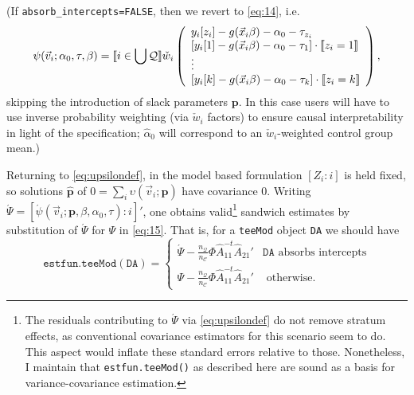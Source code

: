 \documentclass{article}
\DeclarePairedDelimiter{\indicator}{\llbracket}{\rrbracket}
\newcommand{\owt}[1][{[z_{i}]}]{\ensuremath{\check{w}_{i#1}}}
\newcommand{\absorbInterceptsEF}{\upsilon}
\begin{document}
(If \texttt{absorb\_intercepts=FALSE}, then we revert to \eqref{eq:14}, i.e.
\begin{equation*}
         \psi(\vec{v}_{i};
  \alpha_{0}, \tau, \beta) = \indicator{i \in \bigcup \mathcal{Q}}\owt[]
         \left( \begin{array}{l}
           y_{i}[z_{i}] - g(\vec{x}_{i}\beta)-
                  \alpha_0 - \tau_{z_{i}}\\
           {}[y_{i}[1] - g(\vec{x}_{i}\beta)-
                  \alpha_0-\tau_{1}]\cdot \indicator{z_{i}=1}\\
                  \vdots \\
           {}[y_{i}[k] - g(\vec{x}_{i}\beta)-
                 \alpha_0 - \tau_{k}]\cdot \indicator{z_{i}=k}\\%
                \end{array}\right),
\end{equation*}
skipping the introduction of slack parameters $\mathbf{p}$.
In this case users will have to use inverse probability weighting (via
$\owt[]$ factors) to ensure causal interpretability in light of the
specification;  $\hat{\alpha}_0$ will correspond to an $\owt[]$-weighted
control group mean.)

Returning to \eqref{eq:upsilondef}, in the model based formulation $[Z_{i}: i]$ is held fixed, so
solutions $\hat{\mathbf{p}}$ of
$0 = \sum_{i}\absorbInterceptsEF(\vec{v}_{i}; \mathbf{p})$ have
covariance 0.  Writing $\acute{\Psi} =
[\acute{\psi}(\vec{v}_{i}; \mathbf{p}, \beta, \alpha_{0}, \tau) : i]'$, one
obtains valid\footnote{%
The residuals contributing to $\acute{\Psi}$ via \eqref{eq:upsilondef} do not remove stratum
effects, as conventional covariance estimators for this scenario
seem to do.  This aspect would inflate these standard errors
relative to those. Nonetheless, I maintain that
\texttt{estfun.teeMod()} as described here are sound as a
basis for variance-covariance estimation.}
  sandwich estimates by substitution of $\acute{\Psi}$ for
$\Psi$ in \eqref{eq:15}.  That is, for a
\texttt{teeMod} object \texttt{DA} we should have
\begin{equation*}\label{eq:26}
\mathtt{estfun.teeMod(DA)} =
  \begin{cases}
  \acute{\Psi} -
  \frac{n_{\mathcal{Q}}}{n_{\mathcal{C}}}\Phi
  \hat{A}_{11}^{-t}\hat{A}_{21}'& \mathtt{DA} \text{ absorbs
    intercepts}\\
\Psi -
  \frac{n_{\mathcal{Q}}}{n_{\mathcal{C}}}\Phi
  \hat{A}_{11}^{-t}\hat{A}_{21}'  & \text{ otherwise}.
\end{cases}
\end{equation*}
\end{document}
